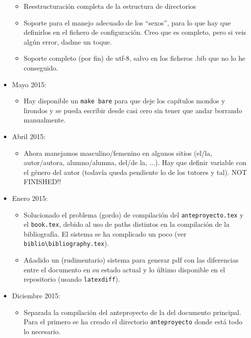 \begin{itemize}
\begin{itemize}
\begin{itemize}
    \end{itemize}
    
  \item Reestructuración completa de la estructura de directorios
  \item Soporte para el manejo adecuado de los ``sexos'', para lo
    que hay que definirlos en el fichero de configuración. Creo que es
    completo, pero si veis algún error, dadme un toque.
  \item Soporte completo (por fin) de utf-8, salvo en los ficheros
    .bib que no lo he conseguido.    
  \end{itemize}
  
\item Mayo 2015:
  \begin{itemize}
  \item Hay disponible un \texttt{make bare} para que deje los capítulos
    mondos y lirondos y se pueda escribir desde casi cero sin tener que
    andar borrando manualmente.
  \end{itemize}


\item Abril 2015:
  \begin{itemize}
  \item Ahora manejamos masculino/femenino en algunos sitios (el/la,
    autor/autora, alumno/alumna, del/de la, ...). Hay que definir
    variable con el género del autor (todavía queda pendiente lo de los
    tutores y tal). NOT FINISHED!!
  \end{itemize}


\item Enero 2015:
  \begin{itemize}
  \item Solucionado el problema (gordo) de compilación del
    \texttt{anteproyecto.tex} y el \texttt{book.tex}, debido al uso de
    paths distintos en la compilación de la bibliografía. El sistema se ha
    complicado un poco (ver
    \texttt{biblio\textbackslash{}bibliography.tex}).
  \item Añadido un (rudimentario) sistema para generar pdf con las
    diferencias entre el documento en su estado actual y lo último
    disponible en el repositorio (usando \texttt{latexdiff}).
  \end{itemize}
\item Diciembre 2015:
  \begin{itemize}
  \item Separada la compilación del anteproyecto de la del documento
    principal. Para el primero se ha creado el directorio
    \texttt{anteproyecto} donde está todo lo necesario.
  \end{itemize}
\end{itemize}





